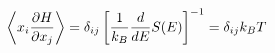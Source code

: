 
\begin{theorem}[Gleichverteilungssatz]
    \begin{align*}
        \left\langle x_i \frac{\partial H}{\partial x_j} \right\rangle
        = \delta_{ij} \left[ \frac{1}{k_B} \frac{d}{dE} S(E) \right]^{-1}
        = \delta_{ij} k_B T
    \end{align*}
\end{theorem}



